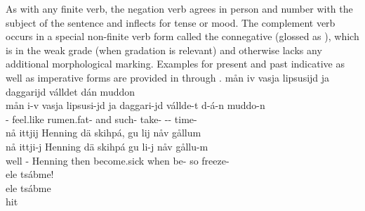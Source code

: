 As with any finite verb, the negation verb agrees in person and number with the subject of the sentence and inflects for tense or mood. The complement verb occurs in a special non-finite verb form called the connegative (glossed as \mbox{\CONNEGs}), which is in the weak grade (when gradation is relevant) and otherwise lacks any additional morphological marking. Examples for present and past indicative as well as imperative forms are provided in  through . 
\ea\label{connegEx1}%
\glll	mån iv vasja lipsusijd ja daggarijd válldet dán muddon\\
	mån i-v vasja lipsusi-jd ja daggari-jd vállde-t d-á-n muddo-n\\
	 - feel.like\BS{} rumen.fat- and such- take- -- time-\\\nopagebreak
{}	
\z
\ea\label{connegEx2}%
\glll	nå ittjij Henning dä skihpá, gu lij nåv gållum\\
	nå ittji-j Henning dä skihpá gu li-j nåv gållu-m\\
	well - Henning\BS{} then become.sick\BS{} when be- so freeze-\\\nopagebreak
{}	
\z
\ea\label{negImpEx1}%
\glll	ele tsábme!\\
	ele tsábme\\
	\BS{} hit\BS{}\\\nopagebreak
{}	
\z




